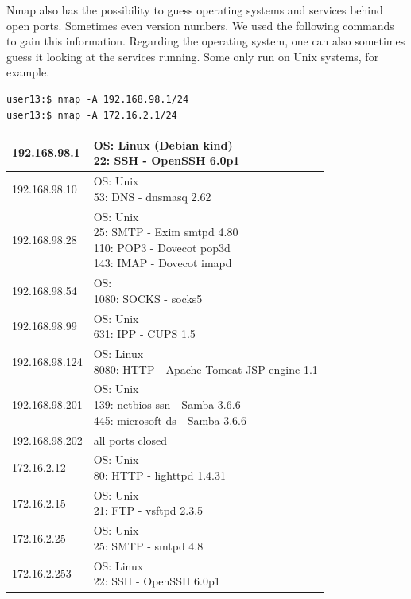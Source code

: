 \documentclass[12pt,a4paper,titlepage,oneside]{scrartcl}
\begin{document}
Nmap also has the possibility to guess operating systems and services behind open ports. Sometimes even version numbers. We used the following commands to gain this information. Regarding the operating system, one can also sometimes guess it looking at the services running. Some only run on Unix systems, for example.

\begin{lstlisting}[style=simple]
user13:$ nmap -A 192.168.98.1/24
user13:$ nmap -A 172.16.2.1/24
\end{lstlisting}

\renewcommand{\arraystretch}{2.5}
\begin{tabular}{| l | l |}
\hline
192.168.98.1 & \pbox[c]{\textwidth}{OS: Linux (Debian kind) \\ 22: SSH - OpenSSH 6.0p1} \\ \hline
192.168.98.10 & \pbox[c]{\textwidth}{OS: Unix  \\ 53: DNS - dnsmasq 2.62} \\ \hline
192.168.98.28 & \pbox[c]{\textwidth}{OS: Unix  \\ 25: SMTP - Exim smtpd 4.80 \\ 110: POP3 - Dovecot pop3d \\ 143: IMAP - Dovecot imapd} \\ \hline
192.168.98.54 & \pbox[c]{\textwidth}{ OS:  \\ 1080: SOCKS - socks5}  \\ \hline
192.168.98.99 & \pbox[c]{\textwidth}{OS: Unix  \\ 631: IPP - CUPS 1.5}  \\ \hline
192.168.98.124 & \pbox[c]{\textwidth}{OS: Linux \\ 8080: HTTP - Apache Tomcat JSP engine 1.1}  \\ \hline
192.168.98.201 & \pbox[c]{\textwidth}{OS: Unix \\ 139: netbios-ssn - Samba 3.6.6 \\ 445: microsoft-ds - Samba 3.6.6}  \\ \hline
192.168.98.202 & all ports closed  \\ \hline
172.16.2.12 & \pbox[c]{\textwidth}{OS: Unix  \\ 80: HTTP - lighttpd 1.4.31}  \\ \hline
172.16.2.15 & \pbox[c]{\textwidth}{OS: Unix \\ 21: FTP - vsftpd 2.3.5}  \\ \hline
172.16.2.25 & \pbox[c]{\textwidth}{OS: Unix \\ 25: SMTP - smtpd 4.8}  \\ \hline
172.16.2.253 & \pbox[c]{\textwidth}{OS: Linux \\ 22: SSH - OpenSSH 6.0p1}  \\ \hline
\end{tabular}
\end{document}
